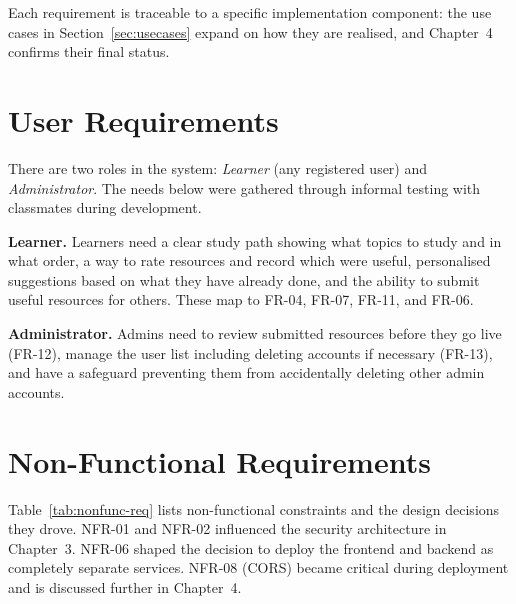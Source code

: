 \documentclass[12pt,a4paper]{report}
\begin{document}
Each requirement is traceable to a specific implementation component: the use cases in Section~\ref{sec:usecases} expand on how they are realised, and Chapter~4 confirms their final status.

\section{User Requirements}
\label{sec:user-req}

There are two roles in the system: \textit{Learner} (any registered user) and \textit{Administrator}. The needs below were gathered through informal testing with classmates during development.

\textbf{Learner.} Learners need a clear study path showing what topics to study and in what order, a way to rate resources and record which were useful, personalised suggestions based on what they have already done, and the ability to submit useful resources for others. These map to FR-04, FR-07, FR-11, and FR-06.

\textbf{Administrator.} Admins need to review submitted resources before they go live (FR-12), manage the user list including deleting accounts if necessary (FR-13), and have a safeguard preventing them from accidentally deleting other admin accounts.

\section{Non-Functional Requirements}
\label{sec:nonfunc-req}

Table~\ref{tab:nonfunc-req} lists non-functional constraints and the design decisions they drove. NFR-01 and NFR-02 influenced the security architecture in Chapter~3. NFR-06 shaped the decision to deploy the frontend and backend as completely separate services. NFR-08 (CORS) became critical during deployment and is discussed further in Chapter~4.
\end{document}
